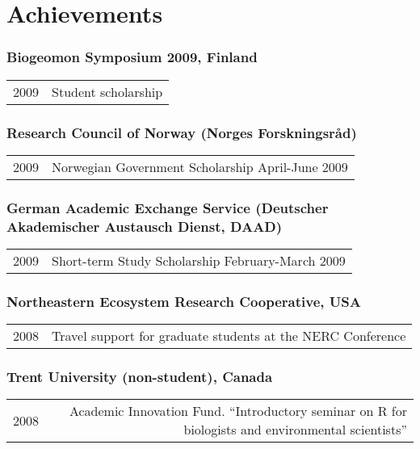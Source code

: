 \section*{Achievements}

\subsubsection*{Biogeomon Symposium 2009, Finland}
\begin{tabular}{L!{\VRule}R}   
2009 & Student scholarship \\
\end{tabular}

\subsubsection*{Research Council of Norway (Norges Forskningsråd)}
\begin{tabular}{L!{\VRule}R}   
2009 & Norwegian Government Scholarship April-June 2009 \\
\end{tabular}

\subsubsection*{German Academic Exchange Service (Deutscher Akademischer Austausch Dienst, DAAD)}
\begin{tabular}{L!{\VRule}R}    
2009 & Short-term Study Scholarship February-March 2009 \\
\end{tabular}

\subsubsection*{Northeastern Ecosystem Research Cooperative, USA}
\begin{tabular}{L!{\VRule}R}    
2008 & Travel support for graduate students at the NERC Conference \\
\end{tabular}

\subsubsection*{Trent University (non-student), Canada}
\begin{tabular}{L!{\VRule}R}     
2008 & Academic Innovation Fund. “Introductory seminar on R for biologists and environmental scientists” \\
\end{tabular}


